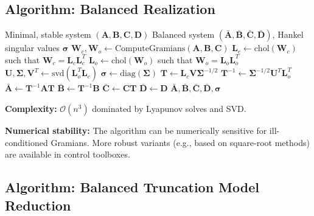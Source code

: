\subsection{Algorithm: Balanced Realization}

\begin{algorithm}[H]
\caption{Balanced Realization Computation}
\label{alg:balanced}
\begin{algorithmic}[1]
\REQUIRE Minimal, stable system $(\mathbf{A}, \mathbf{B}, \mathbf{C}, \mathbf{D})$
\ENSURE Balanced system $(\bar{\mathbf{A}}, \bar{\mathbf{B}}, \bar{\mathbf{C}}, \bar{\mathbf{D}})$, Hankel singular values $\boldsymbol{\sigma}$
\STATE
{}
\STATE $\mathbf{W}_c, \mathbf{W}_o \gets \text{ComputeGramians}(\mathbf{A}, \mathbf{B}, \mathbf{C})$
\STATE
{}
\STATE $\mathbf{L}_c \gets \text{chol}(\mathbf{W}_c)$ such that $\mathbf{W}_c = \mathbf{L}_c\mathbf{L}_c^T$
\STATE $\mathbf{L}_o \gets \text{chol}(\mathbf{W}_o)$ such that $\mathbf{W}_o = \mathbf{L}_o\mathbf{L}_o^T$
\STATE
{}
\STATE $\mathbf{U}, \boldsymbol{\Sigma}, \mathbf{V}^T \gets \text{svd}(\mathbf{L}_o^T \mathbf{L}_c)$
\STATE $\boldsymbol{\sigma} \gets \text{diag}(\boldsymbol{\Sigma})$ 
\STATE
{}
\STATE $\mathbf{T} \gets \mathbf{L}_c \mathbf{V} \boldsymbol{\Sigma}^{-1/2}$
\STATE $\mathbf{T}^{-1} \gets \boldsymbol{\Sigma}^{-1/2} \mathbf{U}^T \mathbf{L}_o^T$
\STATE
{}
\STATE $\bar{\mathbf{A}} \gets \mathbf{T}^{-1} \mathbf{A} \mathbf{T}$
\STATE $\bar{\mathbf{B}} \gets \mathbf{T}^{-1} \mathbf{B}$
\STATE $\bar{\mathbf{C}} \gets \mathbf{C} \mathbf{T}$
\STATE $\bar{\mathbf{D}} \gets \mathbf{D}$
\STATE
\RETURN $\bar{\mathbf{A}}, \bar{\mathbf{B}}, \bar{\mathbf{C}}, \bar{\mathbf{D}}, \boldsymbol{\sigma}$
\end{algorithmic}
\end{algorithm}

\textbf{Complexity:} $\mathcal{O}(n^3)$ dominated by Lyapunov solves and SVD.

\textbf{Numerical stability:} The algorithm can be numerically sensitive for ill-conditioned Gramians. More robust variants (e.g., based on square-root methods) are available in control toolboxes.


\subsection{Algorithm: Balanced Truncation Model Reduction}

